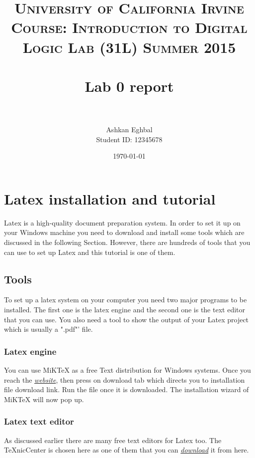 \documentclass[paper=letter, fontsize=11pt]{scrartcl} %
\title{	
\normalfont \normalsize 
\textsc{University of California Irvine} \\  %
\textsc{Course: Introduction to Digital Logic Lab (31L) Summer 2015} \\ [25pt]
\horrule{0.5pt} \\[0.4cm] %
\huge Lab 0 report\\ %
\horrule{2pt} \\[0.5cm] %
}
\author{Ashkan Eghbal \\ Student ID: 12345678} %
\date{\normalsize\today} %
\numberwithin{equation}{section} %
\numberwithin{figure}{section} %
\numberwithin{table}{section} %
\begin{document}
\maketitle %


\section{Latex installation and tutorial}

Latex is a high-quality document preparation system. In order to set it up on your Windows machine you need to download and install some tools which are discussed in the following Section. However, there are hundreds of tools that you can use to set up Latex and this tutorial is one of them. 


\subsection{Tools} %

To set up a latex system on your computer you need two major programs to be installed. The first one is the latex engine and the second one is the text editor that you can use. You also need a tool to show the output of your Latex project which is usually a ".pdf"' file. 


\subsubsection{Latex engine} %

You can use MiKTeX as a free Text distribution for Windows systems. Once you reach the \href{http://miktex.org/download} {\textit{website}}, then press on download tab which directs you to installation file download link. Run the file once it is downloaded. The installation wizard of MiKTeX will now pop up. 

\subsubsection{Latex text editor}
As discussed earlier there are many free text editors for Latex too. The TeXnicCenter is chosen here as one of them that you can \href{http://www.texniccenter.org/download/}{\textit{download}} it from here.
\end{document}

